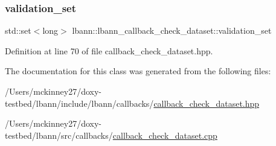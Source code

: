 \subsubsection{\texorpdfstring{validation\+\_\+set}{validation\_set}}
{\footnotesize\ttfamily std\+::set$<$long$>$ lbann\+::lbann\+\_\+callback\+\_\+check\+\_\+dataset\+::validation\+\_\+set\hspace{0.3cm}{\ttfamily [private]}}



Definition at line 70 of file callback\+\_\+check\+\_\+dataset.\+hpp.



The documentation for this class was generated from the following files\+:\begin{DoxyCompactItemize}
\item 
/\+Users/mckinney27/doxy-\/testbed/lbann/include/lbann/callbacks/\hyperlink{callback__check__dataset_8hpp}{callback\+\_\+check\+\_\+dataset.\+hpp}\item 
/\+Users/mckinney27/doxy-\/testbed/lbann/src/callbacks/\hyperlink{callback__check__dataset_8cpp}{callback\+\_\+check\+\_\+dataset.\+cpp}\end{DoxyCompactItemize}

